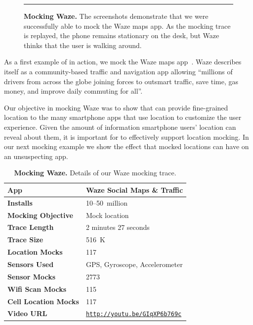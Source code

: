 \begin{figure}[t]
\caption{\textbf{Mocking Waze.} The screenshots demonstrate that we were
successfully able to mock the Waze maps app. As the mocking trace is
replayed, the phone remains stationary on the desk, but Waze thinks that the
user is walking around.}

\vspace*{0.1in}
\hrule
\vspace*{-0.15in}

\label{fig-mocking-waze}

\end{figure}

As a first example of \PocketMocker{} in action, we mock the Waze maps
app~\cite{waze-playstore-url}. Waze describes itself as a community-based
traffic and navigation app allowing ``millions of drivers from across the
globe joining forces to outsmart traffic, save time, gas money, and improve
daily commuting for all''.

Our objective in mocking Waze was to show that \PocketMocker{} can provide
fine-grained location to the many smartphone apps that use location to
customize the user experience. Given the amount of information smartphone
users' location can reveal about them, it is important for \PocketMocker{} to
effectively support location mocking. In our next mocking example we show the
effect that mocked locations can have on an unsuspecting app.

\begin{table}
\begin{tabularx}{3.33in}{lX}
\textbf{App} & Waze Social Maps \& Traffic \\ \toprule
\textbf{Installs} & 10--50~million \\
\textbf{Mocking Objective} & Mock location \\ \midrule
\textbf{Trace Length} & 2 minutes 27 seconds \\
\textbf{Trace Size} & 516~K \\
\textbf{Location Mocks} & 117 \\
\textbf{Sensors Used} & {\small GPS, Gyroscope, Accelerometer} \\
\textbf{Sensor Mocks} & 2773 \\
\textbf{Wifi Scan Mocks} & 115 \\
\textbf{Cell Location Mocks} & 117 \\
\textbf{Video URL} &
\hyperlink{http://youtu.be/GIqXP6b769c}{\texttt{http://youtu.be/GIqXP6b769c}} \\

\end{tabularx}

\caption{\textbf{Mocking Waze.} Details of our Waze mocking trace.}

\label{table-mocking-waze}

\end{table}

